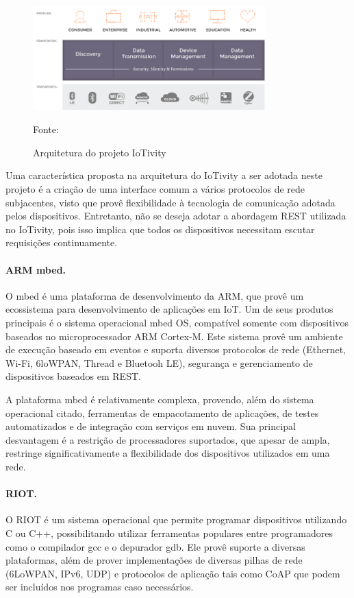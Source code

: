 \begin{figure}[h]
	\centering
	\caption{Arquitetura do projeto IoTivity}
  \includegraphics[width=0.8\textwidth]{imagens/iotivity.png}
  \label{fig:iotivity}  
  
  Fonte: \cite{iotivity}
\end{figure}

Uma característica proposta na arquitetura do IoTivity a ser adotada neste projeto é a criação de uma interface comum a vários protocolos de rede subjacentes, visto que provê flexibilidade à tecnologia de comunicação adotada pelos dispositivos. Entretanto, não se deseja adotar a abordagem REST utilizada no IoTivity, pois isso implica que todos os dispositivos necessitam escutar requisições continuamente. 

\paragraph*{ARM mbed.} O mbed \cite{mbed} é uma plataforma de desenvolvimento da ARM, que provê um ecossistema para desenvolvimento de aplicações em IoT. Um de seus produtos principais é o sistema operacional mbed OS, compatível somente com dispositivos baseados no microprocessador ARM Cortex-M. Este sistema provê um ambiente de execução baseado em eventos e suporta diversos protocolos de rede (Ethernet, Wi-Fi, 6loWPAN, Thread e Bluetooh LE), segurança e gerenciamento de dispositivos baseados em REST.

A plataforma mbed é relativamente complexa, provendo, além do sistema operacional citado, ferramentas de empacotamento de aplicações, de testes automatizados e de integração com serviços  em nuvem. Sua principal desvantagem é a restrição de processadores suportados, que apesar de ampla, restringe significativamente a flexibilidade dos dispositivos utilizados em uma rede. 

\paragraph*{RIOT.} O RIOT \cite{baccelli2013} é um sistema operacional que permite programar dispositivos utilizando  C ou C++, possibilitando utilizar ferramentas populares entre programadores como o compilador gcc e o depurador gdb. Ele provê suporte a diversas plataformas, além de prover implementações de diversas pilhas de rede (6LoWPAN, IPv6, UDP) e protocolos de aplicação tais como CoAP que podem ser incluídos nos programas caso necessários.

